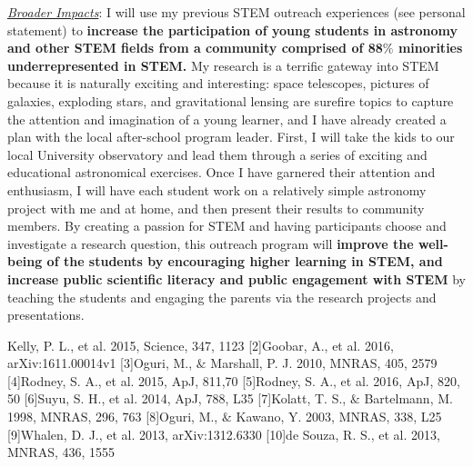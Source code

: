 \noindent\underline{\textit{Broader Impacts}}:
I will use my previous STEM outreach experiences (see personal
statement) to \textbf{increase the participation of young students in
astronomy and other STEM fields from a community comprised of 88$\%$
minorities underrepresented in STEM.}  My research is a terrific
gateway into STEM because it is naturally exciting and interesting:
space telescopes, pictures of galaxies, exploding stars, and
gravitational lensing are surefire topics to capture the attention and
imagination of a young learner, and I have already created a plan with
the local after-school program leader. First, I will take the kids to
our local University observatory and lead them through a series of
exciting and educational astronomical exercises. Once I have garnered
their attention and enthusiasm, I will have each student work on a
relatively simple astronomy project with me and at home, and then
present their results to community members. By creating a passion for
STEM and having participants choose and investigate a research
question, this outreach program will \textbf{improve the well-being of
the students by encouraging higher learning in STEM, and increase
public scientific literacy and public engagement with STEM} by
teaching the students and engaging the parents via the research
projects and presentations.

\noindent\fontsize{10}{14}\selectfont
[1]Kelly, P. L., et al. 2015, Science, 347, 1123 [2]Goobar, A., et
al. 2016, arXiv:1611.00014v1 [3]Oguri, M., $\&$ Marshall, P. J. 2010,
MNRAS, 405, 2579 [4]Rodney, S. A., et al. 2015, ApJ, 811,70
[5]Rodney, S. A., et al. 2016, ApJ, 820, 50 [6]Suyu, S. H., et
al. 2014, ApJ, 788, L35 [7]Kolatt, T. S., $\&$ Bartelmann, M. 1998,
MNRAS, 296, 763 [8]Oguri, M., $\&$ Kawano, Y. 2003, MNRAS, 338, L25
[9]Whalen, D. J., et al. 2013, arXiv:1312.6330 [10]de Souza, R. S., et al. 2013, MNRAS, 436, 1555
\pagebreak




